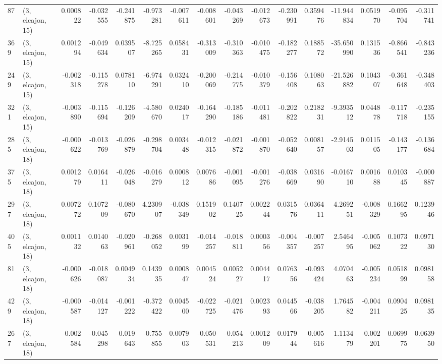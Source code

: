 \begin{tabular}{llrrrrrrrrrrrrrr}
87  &  (3, elcajon, 15) &   0.000822 & -0.032555 & -0.241875 &  -0.973281 & -0.007611 &  -0.008601 & -0.043269 & -0.012673 & -0.230991 &  0.359476 &   -11.944834 &   0.051970 &  -0.095704 &  -0.311741 \\
369 &  (3, elcajon, 15) &   0.001294 & -0.049634 &  0.039507 &  -8.725265 &  0.058431 &  -0.313009 & -0.310363 & -0.010475 & -0.182277 &  0.188572 &   -35.650990 &   0.131536 &  -0.866541 &  -0.843236 \\
249 &  (3, elcajon, 15) &  -0.002318 & -0.115278 &  0.078110 &  -6.974291 &  0.032410 &  -0.200069 & -0.214775 & -0.010379 & -0.156408 &  0.108063 &   -21.526882 &   0.104307 &  -0.361648 &  -0.348403 \\
321 &  (3, elcajon, 15) &  -0.003890 & -0.115694 & -0.126209 &  -4.580670 &  0.024017 &  -0.164290 & -0.185186 & -0.011481 & -0.202822 &  0.218231 &    -9.393512 &   0.044878 &  -0.117718 &  -0.235155 \\
285 &  (3, elcajon, 18) &  -0.000622 & -0.013769 & -0.026879 &  -0.298704 &  0.003448 &  -0.012315 & -0.021872 & -0.001870 & -0.052640 &  0.008157 &    -2.914503 &   0.011505 &  -0.143177 &  -0.136684 \\
375 &  (3, elcajon, 18) &   0.001279 &  0.016411 & -0.026048 &  -0.016279 &  0.000812 &   0.007686 & -0.001095 & -0.001276 & -0.038669 &  0.031690 &    -0.016710 &   0.001688 &   0.010345 &  -0.000887 \\
297 &  (3, elcajon, 18) &   0.007272 &  0.107209 & -0.080670 &   4.230907 & -0.038349 &   0.151902 &  0.140725 &  0.002244 &  0.031576 &  0.036411 &     4.269251 &  -0.008329 &   0.166295 &   0.123946 \\
405 &  (3, elcajon, 18) &   0.001132 &  0.014063 & -0.020961 &  -0.268052 &  0.003199 &  -0.014257 & -0.018811 &  0.000356 & -0.004357 & -0.007257 &     2.546495 &  -0.005062 &   0.107322 &   0.097130 \\
81  &  (3, elcajon, 18) &  -0.000626 & -0.018087 &  0.004934 &   0.143935 &  0.000847 &   0.004524 &  0.005227 &  0.004417 &  0.076356 & -0.093424 &     4.070463 &  -0.005234 &   0.051899 &   0.098158 \\
429 &  (3, elcajon, 18) &  -0.000587 & -0.014127 & -0.001222 &  -0.372422 &  0.004500 &  -0.022725 & -0.021476 &  0.002393 &  0.044566 & -0.038205 &     1.764582 &  -0.004211 &   0.090425 &   0.098135 \\
267 &  (3, elcajon, 18) &  -0.002584 & -0.045298 & -0.019643 &  -0.755855 &  0.007903 &  -0.050531 & -0.054213 &  0.001209 &  0.017944 & -0.005616 &     1.113479 &  -0.002201 &   0.069975 &   0.063950 \\

\end{tabular}
